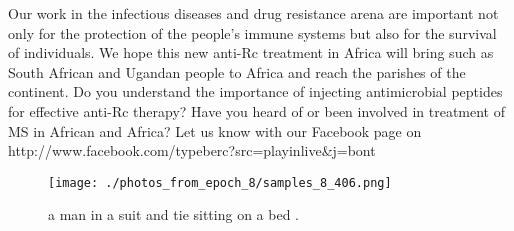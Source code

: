 \documentclass{article}%
\begin{document}
Our work in the infectious diseases and drug resistance arena are important not only for the protection of the people's immune systems but also for the survival of individuals. We hope this new anti{-}Rc treatment in Africa will bring such as South African and Ugandan people to Africa and reach the parishes of the continent.\newline%
Do you understand the importance of injecting antimicrobial peptides for effective anti{-}Rc therapy? Have you heard of or been involved in treatment of MS in African and Africa? Let us know with our Facebook page on http://www.facebook.com/typeberc?src=playinlive\&j=bont

%


\begin{figure}[h!]%
\centering%
\texttt{[image: ./photos\_from\_epoch\_8/samples\_8\_406.png]}%
\caption{a man in a suit and tie sitting on a bed .}%
\end{figure}

%
\end{document}
